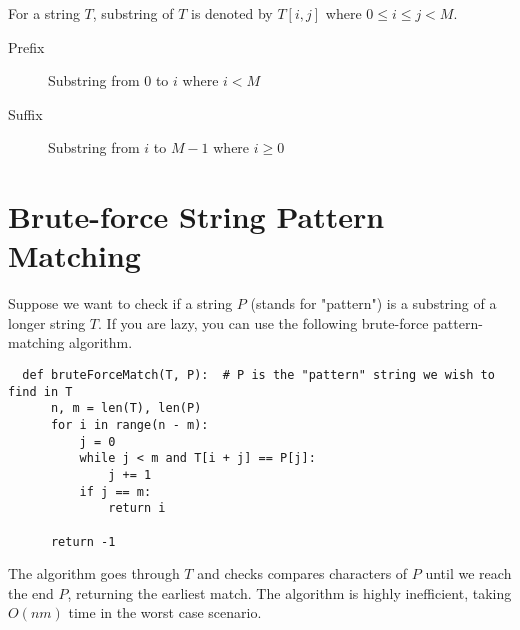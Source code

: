 
For a string $T$, substring of $T$ is denoted by $T[i,j]$ where $0 \leq i \leq j < M$.

\begin{description}
  \item[Prefix] Substring from $0$ to $i$ where $i < M$
  \item[Suffix] Substring from $i$ to $M - 1$ where $i \geq 0$
\end{description}

\section{Brute-force String Pattern Matching}

Suppose we want to check if a string $P$ (stands for "pattern") is a substring of a longer string $T$.
If you are lazy, you can use the following brute-force pattern-matching algorithm.

\begin{verbatim}
  def bruteForceMatch(T, P):  # P is the "pattern" string we wish to find in T
      n, m = len(T), len(P)
      for i in range(n - m):
          j = 0
          while j < m and T[i + j] == P[j]:
              j += 1
          if j == m:
              return i

      return -1
\end{verbatim}

\noindent The algorithm goes through $T$ and checks compares characters of $P$ until we reach the end $P$, returning the earliest match.
The algorithm is highly inefficient, taking $O(nm)$ time in the worst case scenario.

